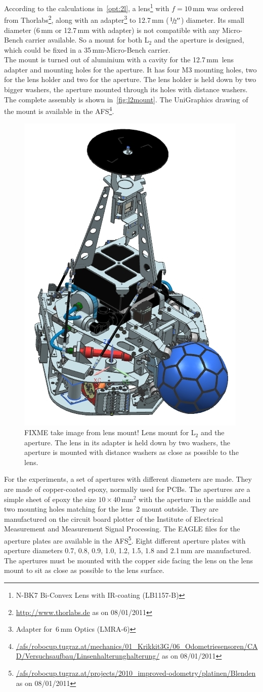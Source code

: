 \documentclass[12pt,a4paper]{article}
\newcommand{\EMT}{Institute of Electrical Measurement and Measurement Signal Processing}
\begin{document}
According to the calculations in~\autoref{opt:2l}, a lens\footnote{N-BK7 Bi-Convex Lens with IR-coating (LB1157-B)} with $f=10$\,mm was ordered from Thorlabs\footnote{\url{http://www.thorlabs.de} as on 08/01/2011}, along with an adapter\footnote{Adapter for \diameter\,6\,mm Optics (LMRA-6)} to 12.7\,mm ($\sfrac{1}{2}''$) diameter.
Its small diameter (6\,mm or 12.7\,mm with adapter) is not compatible with any Micro-Bench carrier available.
So a mount for both L$_2$ and the aperture is designed, which could be fixed in a 35\,mm-Micro-Bench carrier.\\
The mount is turned out of aluminium with a cavity for the 12.7\,mm~lens adapter and mounting holes for the aperture.
It has four M3 mounting holes, two for the lens holder and two for the aperture.
The lens holder is held down by two bigger washers, the aperture mounted through its holes with distance washers.
The complete assembly is shown in~\autoref{fig:l2mount}.
The UniGraphics drawing of the mount is available in the AFS\footnote{\url{/afs/robocup.tugraz.at/mechanics/01_Krikkit3G/06_Odometriesensoren/CAD/Versuchsaufbau/Linsenhalterunghalterung/} as on 08/01/2011}.

\begin{figure}[htbp]
\begin{center}
\includegraphics[width=0.4\columnwidth]{figures/Krikkit3G.jpg}
\caption{\label{fig:l2mount}
FIXME take image from lens mount!
Lens mount for L$_2$ and the aperture.
The lens in its adapter is held down by two washers,
the aperture is mounted with distance washers as close as possible to the lens.
}
\end{center}
\end{figure}

For the experiments, a set of apertures with different diameters are made.
They are made of copper-coated epoxy, normally used for PCBs.
The apertures are a simple sheet of epoxy the size $10\times40$\,mm$^2$ with the aperture in the middle and two mounting holes matching for the lens~2 mount outside.
They are manufactured on the circuit board plotter of the \EMT. 
The EAGLE files for the aperture plates are available in the AFS\footnote{\url{/afs/robocup.tugraz.at/projects/2010_improved-odometry/platinen/Blenden} as on 08/01/2011}.
Eight different aperture plates with aperture diameters 0.7, 0.8, 0.9, 1.0, 1.2, 1.5, 1.8 and 2.1\,mm are manufactured.
The apertures must be mounted with the copper side facing the lens on the lens mount to sit as close as possible to the lens surface.
\end{document}
